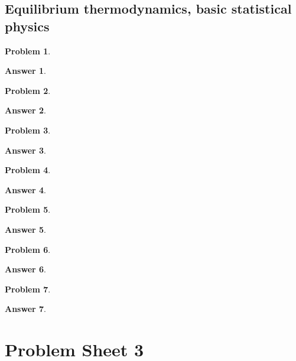 \documentclass[a4paper]{article}
\newtheorem{ans}{Answer}[section]
\theoremstyle{new}
\newtheorem{qns}{Problem}[section]
\begin{document}
\subsection*{Equilibrium thermodynamics, basic statistical physics}
\begin{qns}

\end{qns}
\begin{ans}

\end{ans}
\begin{qns}

\end{qns}
\begin{ans}

\end{ans}
\newpage
\begin{qns}

\end{qns}
\begin{ans}

\end{ans}
\begin{qns}

\end{qns}
\begin{ans}

\end{ans}
\newpage
\begin{qns}

\end{qns}
\begin{ans}

\end{ans}
\begin{qns}

\end{qns}
\begin{ans}

\end{ans}
\newpage
\begin{qns}

\end{qns}
\begin{ans}

\end{ans}
\newpage
\section{Problem Sheet 3}
\end{document}
